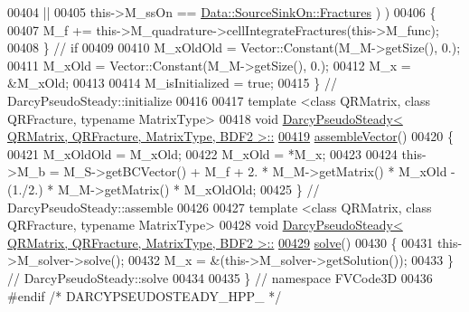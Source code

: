 \begin{DoxyCode}
00404                 ||
00405               this->M\_ssOn == \hyperlink{classFVCode3D_1_1Data_a4d66e2e205b350cb240820540339e1a3aaa3a14735ecc914d217c516ad93fb640}{Data::SourceSinkOn::Fractures} ) )
00406     \{
00407         M\_f += this->M\_quadrature->cellIntegrateFractures(this->M\_func);
00408     \} \textcolor{comment}{// if}
00409 
00410     M\_xOldOld = Vector::Constant(M\_M->getSize(), 0.);
00411     M\_xOld = Vector::Constant(M\_M->getSize(), 0.);
00412     M\_x = &M\_xOld;
00413 
00414     M\_isInitialized = \textcolor{keyword}{true};
00415 \} \textcolor{comment}{// DarcyPseudoSteady::initialize}
00416 
00417 \textcolor{keyword}{template} <\textcolor{keyword}{class} QRMatrix, \textcolor{keyword}{class} QRFracture, \textcolor{keyword}{typename} MatrixType>
00418 \textcolor{keywordtype}{void} \hyperlink{classFVCode3D_1_1DarcyPseudoSteady}{DarcyPseudoSteady< QRMatrix, QRFracture, MatrixType, BDF2 >::}
\hypertarget{DarcyPseudoSteady_8hpp_source.tex_l00419}{}\hyperlink{classFVCode3D_1_1DarcyPseudoSteady_3_01QRMatrix_00_01QRFracture_00_01MatrixType_00_01BDF2_01_4_a9c4260f6d5d17c797435cbb4d0fbed47}{00419} \hyperlink{classFVCode3D_1_1DarcyPseudoSteady}{assembleVector}()
00420 \{
00421     M\_xOldOld = M\_xOld;
00422     M\_xOld = *M\_x;
00423 
00424     this->M\_b = M\_S->getBCVector() + M\_f + 2. * M\_M->getMatrix() * M\_xOld - (1./2.) * M\_M->getMatrix() * 
      M\_xOldOld;
00425 \} \textcolor{comment}{// DarcyPseudoSteady::assemble}
00426 
00427 \textcolor{keyword}{template} <\textcolor{keyword}{class} QRMatrix, \textcolor{keyword}{class} QRFracture, \textcolor{keyword}{typename} MatrixType>
00428 \textcolor{keywordtype}{void} \hyperlink{classFVCode3D_1_1DarcyPseudoSteady}{DarcyPseudoSteady< QRMatrix, QRFracture, MatrixType, BDF2 >::}
\hypertarget{DarcyPseudoSteady_8hpp_source.tex_l00429}{}\hyperlink{classFVCode3D_1_1DarcyPseudoSteady_3_01QRMatrix_00_01QRFracture_00_01MatrixType_00_01BDF2_01_4_a4b0a1521154a61420ef1bc0506d65ae5}{00429} \hyperlink{classFVCode3D_1_1DarcyPseudoSteady}{solve}()
00430 \{
00431     this->M\_solver->solve();
00432     M\_x = &(this->M\_solver->getSolution());
00433 \} \textcolor{comment}{// DarcyPseudoSteady::solve}
00434 
00435 \} \textcolor{comment}{// namespace FVCode3D}
00436 \textcolor{preprocessor}{#endif }\textcolor{comment}{/* DARCYPSEUDOSTEADY\_HPP\_ */}\textcolor{preprocessor}{}
\end{DoxyCode}
